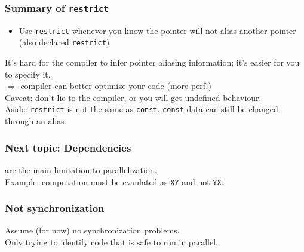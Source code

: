 \documentclass[aspectratio=43]{beamer}
\newenvironment{changemargin}[1]{%
  \begin{list}{}{%
    \setlength{\topsep}{0pt}%
    \setlength{\leftmargin}{#1}%
    \setlength{\rightmargin}{1em}
    \setlength{\listparindent}{\parindent}%
    \setlength{\itemindent}{\parindent}%
    \setlength{\parsep}{\parskip}%
  }%
  \item[]}{\end{list}}
\begin{document}
\begin{frame}[fragile]
  \frametitle{Summary of {\tt restrict}}

  \begin{changemargin}{2.5cm}
  \begin{itemize}
    \item Use {\tt restrict} whenever you know the pointer will not alias
      another pointer (also declared {\tt restrict})
  \end{itemize}

    It's hard for the compiler to infer pointer aliasing information;
    it's easier for you to specify it.\\[1em]

    $\Rightarrow$ compiler can better optimize your code (more perf!)\\[1em]

    Caveat: don't lie to the compiler, or  you will get
      \alert{undefined behaviour}.\\[1em]

    Aside: {\tt restrict} is not the same as {\tt const}. {\tt const} data can still be
      changed through an alias.
  \end{changemargin}
\end{frame}

\begin{frame}
  \frametitle{Next topic: Dependencies}

  \Large
  \begin{changemargin}{2.5cm}
      are the main
      limitation to parallelization.\\[1em]
     Example: computation must be evaulated as {\tt XY} and not {\tt YX}.\\[1em]
  \end{changemargin}
\end{frame}

\begin{frame}
  \frametitle{Not synchronization}

  \Large
  \begin{changemargin}{2.5cm}
      Assume (for now) no synchronization problems.\\[1em]
      Only trying to identify code that is safe to run in
      parallel.

  \end{changemargin}
\end{frame}
\end{document}

